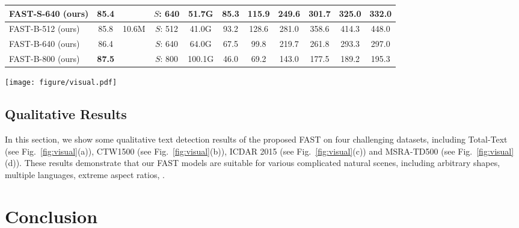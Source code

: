 \documentclass[lettersize,journal]{IEEEtran}
\begin{document}
\begin{table*}[t]
{\begin{tabular}{lcccccccccc}
    FAST-S-640 (ours)  & 85.4  &  & $S$: 640 & 51.7G & 85.3 & 115.9 &249.6 & 301.7 & 325.0 & 332.0  \\
    \midrule
    FAST-B-512 (ours) & 85.8 & \multirow{3}{*}{10.6M} & $S$: 512 & 41.0G & 93.2 & 128.6 & 281.0 & 358.6 & 414.3 & 448.0 \\
    FAST-B-640 (ours)  & 86.4 &  & $S$: 640 & 64.0G  & 67.5 &99.8 &219.7 & 261.8 & 293.3 & 297.0 \\
    FAST-B-800 (ours)  & \textbf{87.5} &  & $S$: 800 & 100.1G & 46.0 &69.2 & 143.0 & 177.5 & 189.2 & 195.3 \\
    \bottomrule
    \end{tabular}}
    \label{tab:more_comparison}
\end{table*}


\begin{figure*}[!t]
    \centering
    \texttt{[image: figure/visual.pdf]}
    \caption{
    Qualitative text detection results of FAST on Total-Text \cite{ch2017total}, CTW1500 \cite{yuliang2017detecting}, ICDAR 2015 \cite{karatzas2015icdar} and MSRA-TD500 \cite{yao2012detecting}.
    These results show that our FAST models are suitable for various complicated natural scenes, including arbitrary shapes, multiple languages, and extreme aspect ratios.
    }
    \label{fig:visual}
\end{figure*}

\subsection{Qualitative Results}

In this section, we show some qualitative text detection results of the proposed FAST on four challenging datasets, including Total-Text (see Fig.~\ref{fig:visual}(a)), CTW1500 (see Fig.~\ref{fig:visual}(b)), ICDAR 2015 (see Fig.~\ref{fig:visual}(c)) and MSRA-TD500 (see Fig.~\ref{fig:visual}(d)). 
These results demonstrate that our FAST models are suitable for various complicated natural scenes, including arbitrary shapes, multiple languages, extreme aspect ratios, \etc.







\section{Conclusion}
\end{document}
